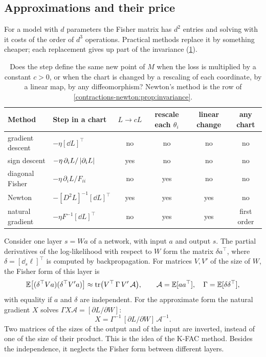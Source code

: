 \begin{notechapter}
\section{Approximations and their price}\label{natural-gradient:sec:ml}

For a model with $d$ parameters the Fisher matrix has $d^2$ entries and
solving with it costs of the order of $d^3$ operations. Practical methods
replace it by something cheaper; each replacement gives up part of the
invariance (\cref{natural-gradient:tab:invariance}).

\begin{table}[ht]
\centering
\small
\begin{tabular}{@{}llcccc@{}}
\toprule
Method & Step in a chart & $L\to cL$ & rescale each $\theta_i$
  & linear change & any chart \\
\midrule
gradient descent & $-\eta[\dd L]^\top$ & no & no & no & no \\
sign descent & $-\eta\,\partial_iL/\left|\partial_iL\right|$
  & yes & no & no & no \\
diagonal Fisher & $-\eta\,\partial_iL/F_{ii}$ & no & yes & no & no \\
Newton & $-[D^2L]^{-1}[\dd L]^\top$ & yes & yes & yes & no \\
natural gradient & $-\eta F^{-1}[\dd L]^\top$ & no & yes & yes
  & first order \\
\bottomrule
\end{tabular}
\caption{Does the step define the same new point of $M$ when the loss is
multiplied by a constant $c > 0$, or when the chart is changed by a
rescaling of each coordinate, by a linear map, by any diffeomorphism?
Newton's method is the row of \cref{contractions-newton:prop:invariance}.}
\label{natural-gradient:tab:invariance}
\end{table}

\begin{mlthread}
Consider one layer $s = Wa$ of a network, with input $a$ and output $s$.
The partial derivatives of the log-likelihood with respect to $W$ form
the matrix $\delta a^\top$, where $\delta = [\dd_s\ell]^\top$ is
computed by backpropagation. For matrices $V, V'$ of the size of $W$,
the Fisher form of this layer is
\[
  \mathbb E\bigl[(\delta^\top Va)(\delta^\top V'a)\bigr]
  \approx\operatorname{tr}\bigl(V^\top\,\Gamma\,V'\,\mathcal A\bigr) ,
  \qquad
  \mathcal A = \mathbb E[aa^\top],\quad
  \Gamma = \mathbb E[\delta\delta^\top] ,
\]
with equality if $a$ and $\delta$ are independent. For the approximate form
the natural gradient $X$ solves $\Gamma X\mathcal A = [\partial L/\partial W]$:
\[
  X = \Gamma^{-1}\,[\partial L/\partial W]\,\mathcal A^{-1} .
\]
Two matrices of the sizes of the output and of the input are inverted,
instead of one of the size of their product. This is the idea of the
K-FAC method. Besides the independence, it neglects the Fisher form
between different layers.
\end{mlthread}


\end{notechapter}
